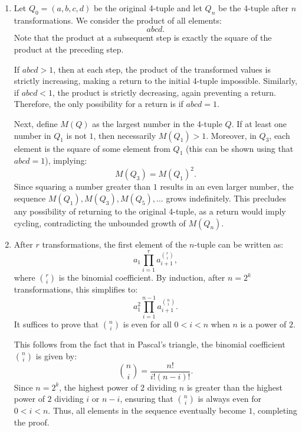 \begin{solution}
    \begin{enumerate}
        \item[(a)] Let \( Q_0 = \left(a, b, c, d\right) \) be the original 4-tuple and let \( Q_n \) be the 4-tuple after \( n \) transformations. We consider the product of all elements:
            \[
                abcd.
            \]
            Note that the product at a subsequent step is exactly the square of the product at the preceding step.

            If \( abcd > 1 \), then at each step, the product of the transformed values is strictly increasing, making a return to the initial 4-tuple impossible. Similarly, if \( abcd < 1 \), the product is strictly decreasing, again preventing a return. Therefore, the only possibility for a return is if \( abcd = 1 \).

            Next, define \( M\left(Q\right) \) as the largest number in the 4-tuple \( Q \). If at least one number in \( Q_1 \) is not \( 1 \), then necessarily \( M\left(Q_1\right) > 1 \). Moreover, in \( Q_3 \), each element is the square of some element from \( Q_1 \) (this can be shown using that \( abcd=1 \)), implying:
            \[
                M\left(Q_3\right) = M\left(Q_1\right)^2.
            \]
            Since squaring a number greater than \( 1 \) results in an even larger number, the sequence \( M\left(Q_1\right), M\left(Q_3\right), M\left(Q_5\right), \dots \) grows indefinitely. This precludes any possibility of returning to the original 4-tuple, as a return would imply cycling, contradicting the unbounded growth of \( M\left(Q_n\right) \).

        \item[(b)] After \( r \) transformations, the first element of the \( n \)-tuple can be written as:
            \[
                a_1 \prod_{i=1}^{r} a_{i+1}^{\binom{r}{i}},
            \]
            where \( \binom{r}{i} \) is the binomial coefficient. By induction, after \( n = 2^k \) transformations, this simplifies to:
            \[
                a_1^2 \prod_{i=1}^{n-1} a_{i+1}^{\binom{n}{i}}.
            \]
            It suffices to prove that \( \binom{n}{i} \) is even for all \( 0 < i < n \) when \( n \) is a power of \( 2 \).

            This follows from the fact that in Pascal's triangle, the binomial coefficient \( \binom{n}{i} \) is given by:
            \[
                \binom{n}{i} = \frac{n!}{i!\left(n-i\right)!}.
            \]
            Since \( n = 2^k \), the highest power of \( 2 \) dividing \( n \) is greater than the highest power of \( 2 \) dividing \( i \) or \( n-i \), ensuring that \( \binom{n}{i} \) is always even for \( 0 < i < n \). Thus, all elements in the sequence eventually become \( 1 \), completing the proof.
    \end{enumerate}
\end{solution}
